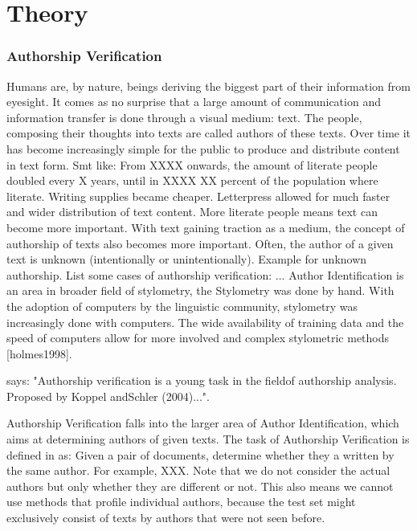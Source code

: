 \chapter{Theory}\label{theory}
\subsection{Authorship Verification}
Humans are, by nature, beings deriving the biggest part of their information from eyesight.
It comes as no surprise that a large amount of communication and information transfer is done through a visual medium: text.
The people, composing their thoughts into texts are called authors of these texts.
Over time it has become increasingly simple for the public to produce and distribute content in text form.
Smt like: From XXXX onwards, the amount of literate people doubled every X years, until in XXXX XX percent of the population where literate.
Writing supplies became cheaper.
Letterpress allowed for much faster and wider distribution of text content.
More literate people means text can become more important.
With text gaining traction as a medium, the concept of authorship of texts also becomes more important.
Often, the author of a given text is unknown (intentionally or unintentionally).
Example for unknown authorship.
List some cases of authorship verification: ... %
Author Identification is an area in broader field of stylometry, the
Stylometry was done by hand.
With the adoption of computers by the linguistic community, stylometry was increasingly done with computers.
The wide availability of training data and the speed of computers allow for more involved and complex stylometric methods [holmes1998].


\cite{stein2019unbiasedGutenbergCorpus} says: "Authorship verification is a young task in the fieldof authorship analysis.
 Proposed by Koppel andSchler (2004)...".

Authorship Verification falls into the larger area of Author Identification, which aims at determining authors of given texts.
The task of Authorship Verification is defined in \cite{bevendorff2020shared} as: Given a pair of documents, determine whether they a written by the same author.
For example, XXX. Note that we do not consider the actual authors but only whether they are different or not.
This also means we cannot use methods that profile individual authors, because the test set might exclusively consist of texts by authors that were not seen before.\\


